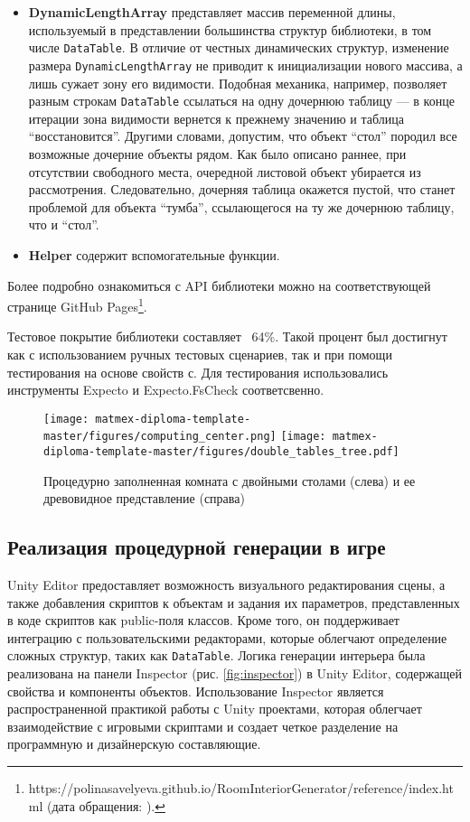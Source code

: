 \begin{itemize}
    \item \textbf{DynamicLengthArray} представляет массив переменной длины, используемый в представлении большинства структур библиотеки, в том числе \texttt{DataTable}. В отличие от честных динамических структур, изменение размера \texttt{DynamicLengthArray} не приводит к инициализации нового массива, а лишь сужает зону его видимости. Подобная механика, например, позволяет разным строкам \texttt{DataTable} ссылаться на одну дочернюю таблицу --- в конце итерации зона видимости вернется к прежнему значению и таблица \enquote{восстановится}. Другими словами, допустим, что объект \enquote{стол} породил все возможные дочерние объекты рядом. Как было описано раннее, при отсутствии свободного места, очередной листовой объект убирается из рассмотрения. Следовательно, дочерняя таблица окажется пустой, что станет проблемой для объекта \enquote{тумба}, ссылающегося на ту же дочернюю таблицу, что и \enquote{стол}. 
    
    \item \textbf{Helper} содержит вспомогательные функции.
    
\end{itemize}

Более подробно ознакомиться с API библиотеки можно на соответствующей странице GitHub Pages\footnote{https://polinasavelyeva.github.io/RoomInteriorGenerator/reference/index.html (дата обращения: ).}.

Тестовое покрытие библиотеки составляет ~64\%. Такой процент был достигнут как с использованием ручных тестовых сценариев, так и при помощи тестирования на основе свойств с. Для тестирования использовались инструменты Expecto и Expecto.FsCheck соответсвенно.

\begin{figure}
    \centering
    \texttt{[image: matmex-diploma-template-master/figures/computing\_center.png]}
    \texttt{[image: matmex-diploma-template-master/figures/double\_tables\_tree.pdf]}
    \caption{Процедурно заполненная комната с двойными столами (слева) и ее древовидное представление (справа)}
    \label{fig:double_table}
\end{figure}

\subsection{Реализация процедурной генерации в игре}

Unity Editor предоставляет возможность визуального редактирования сцены, а также добавления скриптов к объектам и задания их параметров, представленных в коде скриптов как public-поля классов. Кроме того, он поддерживает интеграцию с пользовательскими редакторами, которые облегчают определение сложных структур, таких как \texttt{DataTable}. Логика генерации интерьера была реализована на панели Inspector (рис. \ref{fig:inspector}) в Unity Editor, содержащей свойства и компоненты объектов. Использование Inspector является распространенной практикой работы с Unity проектами, которая облегчает взаимодействие с игровыми скриптами и создает четкое разделение на программную и дизайнерскую составляющие. 

